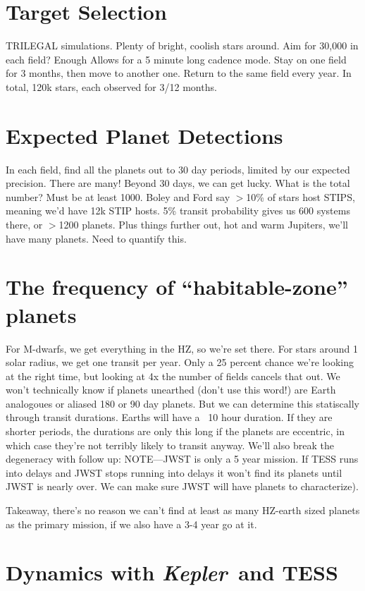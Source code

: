 \documentclass[12pt, preprint]{aastex}
\newcommand{\observatory}[1]{\textsl{#1}}
\newcommand{\kepler}{\observatory{Kepler}}
\newcommand{\Kepler}{\kepler}
\begin{document}
\section{Target Selection}
\label{Targets}
TRILEGAL simulations. Plenty of bright, coolish stars around. Aim for 30,000 
 in each field? Enough  Allows for a 5 minute long cadence mode. Stay on one 
 field for 3 months, then move to another one. Return to the same field every 
 year. In total, 120k stars, each observed for 3/12 months. 

\section{Expected Planet Detections}
\label{Haul}
In each field, find all the planets out to 30 day periods, limited by our 
 expected precision. There are many! Beyond 30 days, we can get lucky. What 
 is the total number? Must be at least 1000. Boley and Ford say $>$10\% of stars 
 host STIPS, meaning we'd have 12k STIP hosts. 5\% transit probability gives us
 600 systems there, or $>$1200 planets. Plus things further out, hot and warm 
 Jupiters, we'll have many planets. Need to quantify this.


\section{The frequency of ``habitable-zone'' planets}
\label{HZ}
For M-dwarfs, we get everything in the HZ, so we're set there. For stars around 
 1 solar radius, we get one transit per year. Only a 25 percent chance we're 
 looking at the right time, but looking at 4x the number of fields cancels that 
 out. We won't technically know if planets unearthed (don't use this word!) are
 Earth analogoues or aliased 180 or 90 day planets. But we can determine this 
 statiscally through transit durations. Earths will have a ~10 hour duration. If they are shorter periods, the durations are only this long if the planets are 
 eccentric, in which case they're not terribly likely to transit anyway. We'll
 also break the degeneracy with follow up: NOTE---JWST is only a 5 year mission. If TESS  runs into delays and JWST stops running into delays it won't find its  planets  until JWST is nearly over. We can make sure JWST will have planets to 
 characterize).

Takeaway, there's no reason we can't find at least as many HZ-earth sized 
 planets as the primary  mission, if we also have a 3-4 year go at it. 


\section{Dynamics with \Kepler\ and TESS}
\label{Dynamics}
\end{document}

